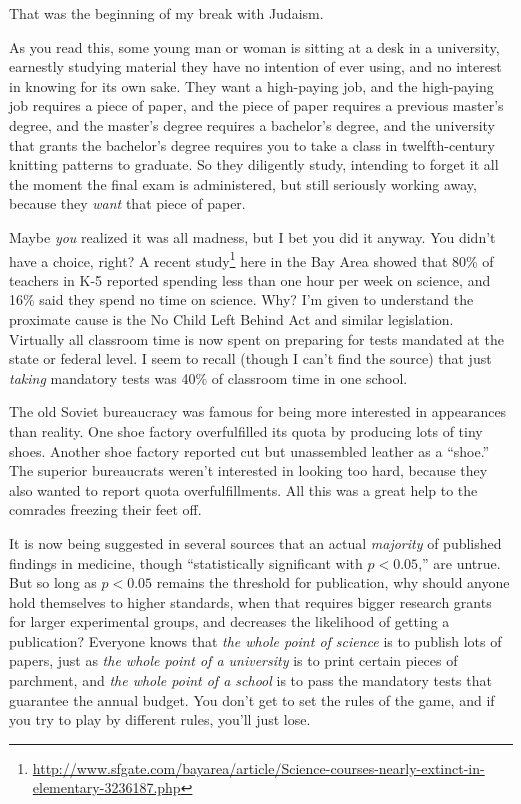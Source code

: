 { That was the beginning of my break with Judaism.


 As you read this, some young man or woman is sitting at a desk in
a university, earnestly studying material they have no intention of
ever using, and no interest in knowing for its own sake. They want a
high-paying job, and the high-paying job requires a piece of paper, and
the piece of paper requires a previous master's degree,
and the master's degree requires a
bachelor's degree, and the university that grants the
bachelor's degree requires you to take a class in
twelfth-century knitting patterns to graduate. So they diligently
study, intending to forget it all the moment the final exam is
administered, but still seriously working away, because they
\textit{want} that piece of paper.


 Maybe \textit{you} realized it was all madness, but I bet you did
it anyway. You didn't have a choice, right? A recent
study\footnote{\url{http://www.sfgate.com/bayarea/article/Science-courses-nearly-extinct-in-elementary-3236187.php}} here in the Bay Area showed that 80\% of teachers in K-5 reported
spending less than one hour per week on science, and 16\% said they
spend no time on science. Why? I'm given to understand
the proximate cause is the No Child Left Behind Act and similar
legislation. Virtually all classroom time is now spent on preparing for
tests mandated at the state or federal level. I seem to recall (though
I can't find the source) that just \textit{taking}
mandatory tests was 40\% of classroom time in one school.


 The old Soviet bureaucracy was famous for being more interested in
appearances than reality. One shoe factory overfulfilled its quota by
producing lots of tiny shoes. Another shoe factory reported cut but
unassembled leather as a ``shoe.''
The superior bureaucrats weren't interested in looking
too hard, because they also wanted to report quota overfulfillments.
All this was a great help to the comrades freezing their feet off.


 It is now being suggested in several sources that an actual
\textit{majority} of published findings in medicine, though
``statistically significant with $p < 0.05$,'' are untrue.
But so long as $p < 0.05$
remains the threshold for publication, why should anyone hold
themselves to higher standards, when that requires bigger research
grants for larger experimental groups, and decreases the likelihood of
getting a publication? Everyone knows that \textit{the whole point of
science} is to publish lots of papers, just as \textit{the whole point
of a university} is to print certain pieces of parchment, and
\textit{the whole point of a school} is to pass the mandatory tests
that guarantee the annual budget. You don't get to set
the rules of the game, and if you try to play by different rules,
you'll just lose.


}
